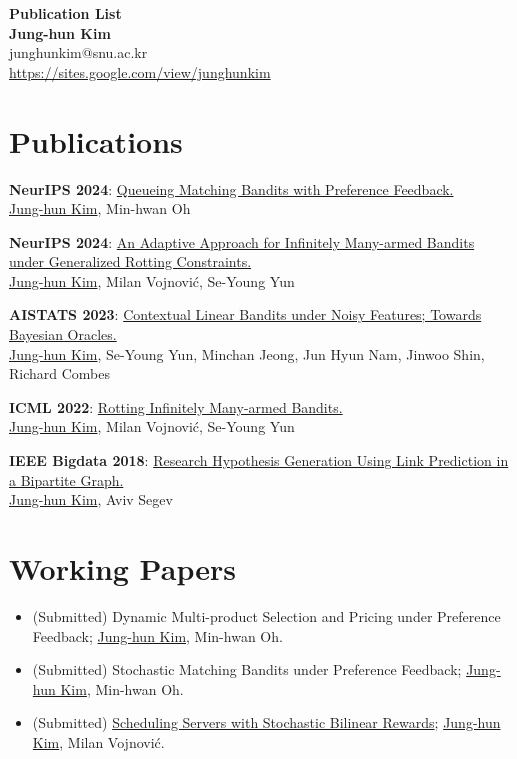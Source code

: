 \documentclass{article}
\begin{document}
\begin{center}
    \LARGE{\textbf{Publication List}} \\
    \vspace{1em}
    \normalsize\textbf{Jung-hun Kim} \\
    \normalsize{junghunkim@snu.ac.kr}\\ 
    \normalsize{\url{https://sites.google.com/view/junghunkim}}
\end{center}

\section*{Publications}
\begin{enumerate}[label={[\arabic*]}]
    \item \textbf{NeurIPS 2024}: \href{https://arxiv.org/abs/2410.10098}{Queueing Matching Bandits with Preference Feedback.} \\
    \underline{Jung-hun Kim}, Min-hwan Oh

    \item \textbf{NeurIPS 2024}: \href{https://arxiv.org/abs/2404.14202}{An Adaptive Approach for Infinitely Many-armed Bandits under Generalized Rotting Constraints.} \\
    \underline{Jung-hun Kim}, Milan Vojnovi{\'c}, Se-Young Yun

    \item \textbf{AISTATS 2023}: \href{https://arxiv.org/abs/1703.01347}{Contextual Linear Bandits under Noisy Features; Towards Bayesian Oracles.} \\
    \underline{Jung-hun Kim}, Se-Young Yun, Minchan Jeong, Jun Hyun Nam, Jinwoo Shin, Richard Combes

    \item \textbf{ICML 2022}: \href{https://arxiv.org/abs/2201.12975}{Rotting Infinitely Many-armed Bandits.} \\
    \underline{Jung-hun Kim}, Milan Vojnovi{\'c}, Se-Young Yun

    \item \textbf{IEEE Bigdata 2018}: \href{https://ieeexplore.ieee.org/stamp/stamp.jsp?tp=&arnumber=8622645}{Research Hypothesis Generation Using Link Prediction in a Bipartite Graph.} \\
    \underline{Jung-hun Kim}, Aviv Segev
\end{enumerate}

\section*{Working Papers}
\begin{itemize}
    \item (Submitted) Dynamic Multi-product Selection and Pricing under Preference Feedback; \underline{Jung-hun Kim}, Min-hwan Oh.
    \item  (Submitted) Stochastic Matching Bandits under Preference Feedback; \underline{Jung-hun Kim}, Min-hwan Oh.
    \item (Submitted) \href{https://arxiv.org/abs/2112.06362}{Scheduling Servers with Stochastic Bilinear Rewards}; \underline{Jung-hun Kim}, Milan Vojnovi{\'c}.
\end{itemize}
\end{document}
